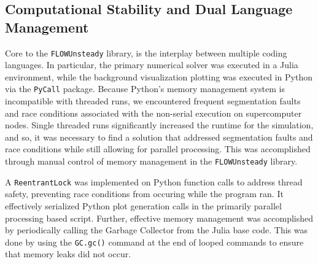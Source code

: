 \documentclass{article}
\begin{document}
\begin{appendices}
\section{Computational Stability and Dual Language Management}\label{app:debugging}
Core to the \texttt{FLOWUnsteady} library, is the interplay between multiple coding languages. In particular, the primary numerical solver was executed in a Julia environment, while the background visualization plotting was executed in Python via the \texttt{PyCall} package.
Because Python's memory management system is incompatible with threaded runs, we encountered frequent segmentation faults and race conditions associated with the non-serial execution on supercomputer nodes.
Single threaded runs significantly increased the runtime for the simulation, and so, it was necessary to find a solution that addressed segmentation faults and race conditions while still allowing for parallel processing.
This was accomplished through manual control of memory management in the \texttt{FLOWUnsteady} library. 

A \texttt{ReentrantLock} was implemented on Python function calls to address thread safety, preventing race conditions from occuring while the program ran. It effectively serialized Python plot generation calls in the primarily parallel processing based script.
Further, effective memory management was accomplished by periodically calling the Garbage Collector from the Julia base code. This was done by using the \texttt{GC.gc()} command at the end of looped commands to ensure that memory leaks did not occur.
\end{appendices}
\end{document}
